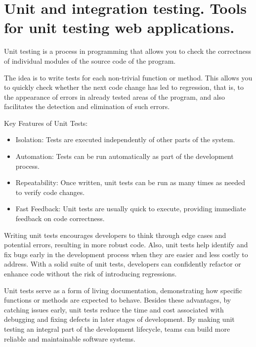 
\pagebreak

\chapter{Unit and integration testing. Tools for unit testing web applications.}


\medskip

Unit testing is a process in programming that allows you to check the correctness of individual modules of the source code of the program.

The idea is to write tests for each non-trivial function or method. This allows you to quickly check whether the next code change has led to regression, that is, to the appearance of errors in already tested areas of the program, and also facilitates the detection and elimination of such errors.

Key Features of Unit Tests:

\begin{itemize}
\item Isolation: Tests are executed independently of other parts of the system.

\item Automation: Tests can be run automatically as part of the development process.

\item Repeatability: Once written, unit tests can be run as many times as needed to verify code changes.

\item Fast Feedback: Unit tests are usually quick to execute, providing immediate feedback on code correctness.
\end{itemize}

Writing unit tests encourages developers to think through edge cases and potential errors, resulting in more robust code. Also, unit tests help identify and fix bugs early in the development process when they are easier and less costly to address. With a solid suite of unit tests, developers can confidently refactor or enhance code without the risk of introducing regressions.

Unit tests serve as a form of living documentation, demonstrating how specific functions or methods are expected to behave. Besides these advantages, by catching issues early, unit tests reduce the time and cost associated with debugging and fixing defects in later stages of development. By making unit testing an integral part of the development lifecycle, teams can build more reliable and maintainable software systems.

